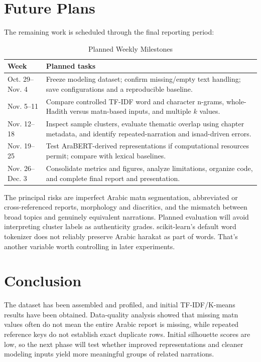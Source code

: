 \documentclass[conference]{IEEEtran}
\begin{document}
\section{Future Plans}
The remaining work is scheduled through the final reporting period:
\begin{table}[h]
\caption{Planned Weekly Milestones}
\centering\footnotesize
\begin{tabular}{p{}p{}}
\toprule
Week & Planned tasks\\
\midrule
Oct. 29--Nov. 4 & Freeze modeling dataset; confirm missing/empty text handling; save configurations and a reproducible baseline.\\
Nov. 5--11 & Compare controlled TF-IDF word and character n-grams, whole-Hadith versus matn-based inputs, and multiple $k$ values.\\
Nov. 12--18 & Inspect sample clusters, evaluate thematic overlap using chapter metadata, and identify repeated-narration and isnad-driven errors.\\
Nov. 19--25 & Test AraBERT-derived representations if computational resources permit; compare with lexical baselines.\\
Nov. 26--Dec. 3 & Consolidate metrics and figures, analyze limitations, organize code, and complete final report and presentation.\\
\bottomrule
\end{tabular}
\end{table}

The principal risks are imperfect Arabic matn segmentation, abbreviated or cross-referenced reports, morphology and diacritics, and the mismatch between broad topics and genuinely equivalent narrations. Planned evaluation will avoid interpreting cluster labels as authenticity grades. scikit-learn's default word tokenizer does not reliably preserve Arabic harakat as part of words. That's another variable worth controlling in later experiments.

\section{Conclusion}
The dataset has been assembled and profiled, and initial TF-IDF/K-means results have been obtained. Data-quality analysis showed that missing matn values often do not mean the entire Arabic report is missing, while repeated reference keys do not establish exact duplicate rows. Initial silhouette scores are low, so the next phase will test whether improved representations and cleaner modeling inputs yield more meaningful groups of related narrations.
\end{document}

